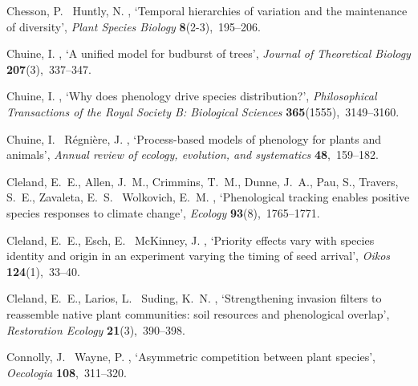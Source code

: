 \documentclass[11pt]{article}
\begin{document}
\begin{thebibliography}{xx}
Chesson, P. \harvardand\ Huntly, N.  \harvardyearright ,
  `Temporal hierarchies of variation and the maintenance of diversity', {\em
  Plant Species Biology} {\bf 8}(2-3),~195--206.

Chuine, I.  \harvardyearright , `A unified model for
  budburst of trees', {\em Journal of Theoretical Biology} {\bf
  207}(3),~337--347.

Chuine, I.  \harvardyearright , `Why does phenology drive
  species distribution?', {\em Philosophical Transactions of the Royal Society
  B: Biological Sciences} {\bf 365}(1555),~3149--3160.

Chuine, I. \harvardand\ R{\'e}gni{\`e}re, J.  \harvardyearright , `Process-based models of phenology for plants and
  animals', {\em Annual review of ecology, evolution, and systematics} {\bf
  48},~159--182.

Cleland, E.~E., Allen, J.~M., Crimmins, T.~M., Dunne, J.~A., Pau, S., Travers,
  S.~E., Zavaleta, E.~S. \harvardand\ Wolkovich, E.~M.  \harvardyearright , `Phenological tracking enables positive species
  responses to climate change', {\em Ecology} {\bf 93}(8),~1765--1771.

Cleland, E.~E., Esch, E. \harvardand\ McKinney, J.  \harvardyearleft
  2015\harvardyearright , `Priority effects vary with species identity and
  origin in an experiment varying the timing of seed arrival', {\em Oikos} {\bf
  124}(1),~33--40.

Cleland, E.~E., Larios, L. \harvardand\ Suding, K.~N.  \harvardyearleft
  2013\harvardyearright , `Strengthening invasion filters to reassemble native
  plant communities: soil resources and phenological overlap', {\em Restoration
  Ecology} {\bf 21}(3),~390--398.

Connolly, J. \harvardand\ Wayne, P.  \harvardyearright ,
  `Asymmetric competition between plant species', {\em Oecologia} {\bf
  108},~311--320.


\end{thebibliography}
\end{document}
